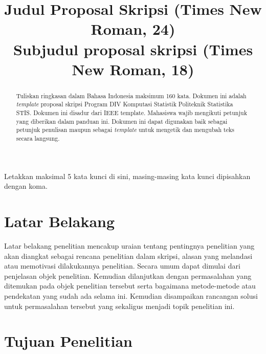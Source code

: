 \documentclass[conference, a4paper]{IEEEtran_ID}
\begin{document}
\title{Judul Proposal Skripsi (Times New Roman, 24) \\ 
\LARGE{Subjudul proposal skripsi (Times New Roman, 18)} %
}

\author{
\vspace{0.5em}
}

\maketitle
\thispagestyle{fancy}

\begin{abstract}
	Tuliskan ringkasan dalam Bahasa Indonesia maksimum 160 kata. Dokumen ini adalah \textit{template} proposal skripsi Program DIV Komputasi Statistik Politeknik Statistika STIS. Dokumen ini disadur dari IEEE template. Mahasiswa wajib mengikuti petunjuk yang diberikan dalam panduan ini. Dokumen ini dapat digunakan baik sebagai petunjuk penulisan maupun sebagai \textit{template} untuk mengetik dan mengubah teks secara langsung.
\end{abstract}

\begin{IEEEkeywords}
	Letakkan maksimal 5 kata kunci di sini, masing-masing kata kunci dipisahkan dengan koma.
\end{IEEEkeywords}



\section{Latar Belakang}

	Latar belakang penelitian mencakup uraian tentang pentingnya penelitian yang akan diangkat sebagai rencana penelitian dalam skripsi, alasan yang melandasi atau memotivasi dilakukannya penelitian. Secara umum dapat dimulai dari penjelasan objek penelitian. Kemudian dilanjutkan dengan permasalahan yang ditemukan pada objek penelitian tersebut serta bagaimana metode-metode atau pendekatan yang sudah ada selama ini. Kemudian disampaikan rancangan solusi untuk permasalahan tersebut yang sekaligus menjadi topik penelitian ini. 

\section{Tujuan Penelitian}
\end{document}
